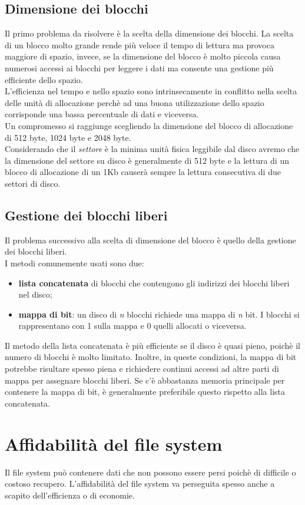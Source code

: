 \documentclass[12pt, letterpaper]{report}
\begin{document}
	\subsection{Dimensione dei blocchi}
	Il primo problema da risolvere è la scelta della dimensione dei blocchi. La scelta di un blocco molto grande rende più veloce il tempo di lettura ma provoca maggiore di spazio, invece, se la dimensione del blocco è molto piccola causa numerosi accessi ai blocchi per leggere i dati ma consente una gestione più efficiente dello spazio. \\
	L'efficienza nel tempo e nello spazio sono intrinsecamente in conflitto nella scelta delle unità di allocazione perchè ad una buona utilizzazione dello spazio corrisponde una bassa percentuale di dati e viceversa. \\
	Un compromesso si raggiunge scegliendo la dimensione del blocco di allocazione di 512 byte, 1024 byte e 2048 byte. \\
	Considerando che il \textit{settore} è la minima unità fisica leggibile dal disco avremo che la dimensione del settore su disco è generalmente di 512 byte e la lettura di un blocco di allocazione di un 1Kb causerà sempre la lettura consecutiva di due settori di disco.
	\subsection{Gestione dei blocchi liberi}
	Il problema successivo alla scelta di dimensione del blocco è quello della gestione dei blocchi liberi. \\
	I metodi comunemente usati sono due:
	\begin{itemize}
		\item \textbf{lista concatenata} di blocchi che contengono gli indirizzi dei blocchi liberi nel disco;
		\item \textbf{mappa di bit}: un disco di \textit{n} blocchi richiede una mappa di \textit{n} bit. I blocchi si rappresentano con 1 sulla mappa e 0 quelli allocati o viceversa.
	\end{itemize}
	Il metodo della lista concatenata è più efficiente se il disco è quasi pieno, poichè il numero di blocchi è molto limitato. Inoltre, in queste condizioni, la mappa di bit potrebbe risultare spesso piena e richiedere continui accessi ad altre parti di mappa per assegnare blocchi liberi. Se c'è abbastanza memoria principale per contenere la mappa di bit, è generalmente preferibile questo rispetto alla lista concatenata.
	\section{Affidabilità del file system}
	Il file system può contenere dati che non possono essere persi poichè di difficile o costoso recupero. L'affidabilità del file system va perseguita spesso anche a scapito dell'efficienza o di economie.
\end{document}
